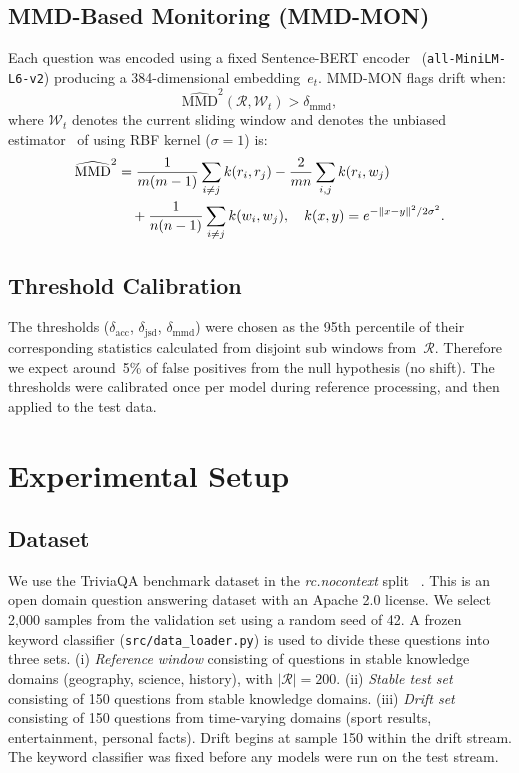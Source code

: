 \documentclass[12pt,a4paper]{article}
\begin{document}
\subsection{MMD-Based Monitoring (\textsc{MMD-MON})}
Each question was encoded using a fixed Sentence-BERT encoder~\cite{Reimers2019} (\texttt{all-MiniLM-L6-v2}) producing a 384-dimensional
embedding~$e_t$.  \textsc{MMD-MON} flags drift when:
\begin{equation}
\widehat{\mathrm{MMD}}^2(\mathcal{R},\mathcal{W}_t)>\delta_\mathrm{mmd},
\label{eq:mmd}
\end{equation}
where $\mathcal{W}_t$ denotes the current sliding window and denotes the unbiased estimator~\cite{Gretton2012} of using RBF kernel ($\sigma=1$) is:
\begin{align}
\widehat{\mathrm{MMD}}^2 &=
  \frac{1}{m(m-1)}\sum_{i\neq j}k(r_i,r_j)
  -\frac{2}{mn}\sum_{i,j}k(r_i,w_j)\notag\\
  &\quad+\frac{1}{n(n-1)}\sum_{i\neq j}k(w_i,w_j),\quad
  k(x,y)=e^{-\|x-y\|^2/2\sigma^2}.
\end{align}

\subsection{Threshold Calibration}
The thresholds ($\delta_\mathrm{acc}$, $\delta_\mathrm{jsd}$, $\delta_\mathrm{mmd}$) were chosen as the 95th percentile of their corresponding statistics calculated from disjoint sub windows from~$\mathcal{R}$. Therefore we expect around~5\% of false positives from the null hypothesis (no shift). The thresholds were calibrated once per model during reference processing, and then applied to the test data.

\section{Experimental Setup}
\label{sec:setup}

\subsection{Dataset}


We use the TriviaQA benchmark dataset in the \textit{rc.nocontext} split ~\cite{Joshi2017}. This is an open domain question answering dataset with an Apache 2.0 license. We select 2,000 samples from the validation set using a random seed of 42. A frozen keyword classifier (\texttt{src/data\_loader.py}) is used to divide these questions into three sets. (i) \emph{Reference window} consisting of questions in stable knowledge domains (geography, science, history), with $|\mathcal{R}|=200$. (ii) \emph{Stable test set} consisting of 150 questions from stable knowledge domains. (iii) \emph{Drift set} consisting of 150 questions from time-varying domains (sport results, entertainment, personal facts). Drift begins at sample 150 within the drift stream. The keyword classifier was fixed before any models were run on the test stream.
\end{document}

